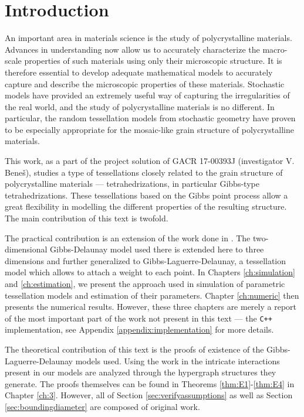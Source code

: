 \chapter*{Introduction}

An important area in materials science is the study of polycrystalline materials. Advances in understanding now allow us to accurately characterize the macro-scale properties of such materials using only their microscopic structure. It is therefore essential to develop adequate mathematical models to accurately capture and describe the microscopic properties of these materials.
Stochastic models have provided an extremely useful way of capturing the irregularities of the real world, and the study of polycrystalline materials is no different. In particular, the random tessellation models from stochastic geometry have proven to be especially appropriate for the mosaic-like grain structure of polycrystalline materials. 

This work, as a part of the project solution of GACR 17-00393J (investigator V. Bene\v{s}), studies a type of tessellations closely related to the grain structure of polycrystalline materials --- tetrahedrizations, in particular Gibbs-type tetrahedrizations. These tessellations based on the Gibbs point process allow a great flexibility in modelling the different properties of the resulting structure. 
The main contribution of this text is twofold. 


The practical contribution is an extension of the work done in \cite{DereudreLavancier2011}. The two-dimensional Gibbs-Delaunay model used there is extended here to three dimensions and further generalized to Gibbs-Laguerre-Delaunay, a tessellation model which allows to attach a weight to each point. In Chapters \ref{ch:simulation} and \ref{ch:estimation}, we present the approach used in simulation of parametric tessellation models and estimation of their parameters. Chapter \ref{ch:numeric} then presents the numerical results. However, these three chapters are merely a report of the most important part of the work not present in this text --- the \texttt{C++} implementation, see Appendix \ref{appendix:implementation} for more details. 

The theoretical contribution of this text is the proofs of existence of the Gibbs-Laguerre-Delaunay models used. Using the work in \cite{DDG12} the intricate interactions present in our models are analyzed through the hypergraph structures they generate. The proofs themselves can be found in Theorems \ref{thm:E1}-\ref{thm:E4} in Chapter \ref{ch:3}. However, all of Section \ref{sec:verifyassumptions} as well as Section \ref{sec:boundingdiameter} are composed of original work. 

